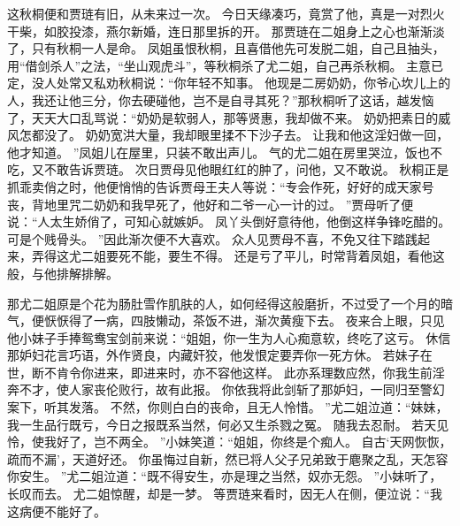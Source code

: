 这秋桐便和贾琏有旧，从未来过一次。
今日天缘凑巧，竟赏了他，真是一对烈火干柴，如胶投漆，燕尔新婚，连日那里拆的开。
那贾琏在二姐身上之心也渐渐淡了，只有秋桐一人是命。
凤姐虽恨秋桐，且喜借他先可发脱二姐，自己且抽头，用“借剑杀人”之法，“坐山观虎斗”，等秋桐杀了尤二姐，自己再杀秋桐。
主意已定，没人处常又私劝秋桐说：“你年轻不知事。
他现是二房奶奶，你爷心坎儿上的人，我还让他三分，你去硬碰他，岂不是自寻其死？”那秋桐听了这话，越发恼了，天天大口乱骂说：“奶奶是软弱人，那等贤惠，我却做不来。
奶奶把素日的威风怎都没了。
奶奶宽洪大量，我却眼里揉不下沙子去。
让我和他这淫妇做一回，他才知道。
”凤姐儿在屋里，只装不敢出声儿。
气的尤二姐在房里哭泣，饭也不吃，又不敢告诉贾琏。
次日贾母见他眼红红的肿了，问他，又不敢说。
秋桐正是抓乖卖俏之时，他便悄悄的告诉贾母王夫人等说：“专会作死，好好的成天家号丧，背地里咒二奶奶和我早死了，他好和二爷一心一计的过。
”贾母听了便说：“人太生娇俏了，可知心就嫉妒。
凤丫头倒好意待他，他倒这样争锋吃醋的。
可是个贱骨头。
”因此渐次便不大喜欢。
众人见贾母不喜，不免又往下踏践起来，弄得这尤二姐要死不能，要生不得。
还是亏了平儿，时常背着凤姐，看他这般，与他排解排解。
\par
那尤二姐原是个花为肠肚雪作肌肤的人，如何经得这般磨折，不过受了一个月的暗气，便恹恹得了一病，四肢懒动，茶饭不进，渐次黄瘦下去。
夜来合上眼，只见他小妹子手捧鸳鸯宝剑前来说：“姐姐，你一生为人心痴意软，终吃了这亏。
休信那妒妇花言巧语，外作贤良，内藏奸狡，他发恨定要弄你一死方休。
若妹子在世，断不肯令你进来，即进来时，亦不容他这样。
此亦系理数应然，你我生前淫奔不才，使人家丧伦败行，故有此报。
你依我将此剑斩了那妒妇，一同归至警幻案下，听其发落。
不然，你则白白的丧命，且无人怜惜。
”尤二姐泣道：“妹妹，我一生品行既亏，今日之报既系当然，何必又生杀戮之冤。
随我去忍耐。
若天见怜，使我好了，岂不两全。
”小妹笑道：“姐姐，你终是个痴人。
自古‘天网恢恢，疏而不漏’，天道好还。
你虽悔过自新，然已将人父子兄弟致于麀聚之乱，天怎容你安生。
”尤二姐泣道：“既不得安生，亦是理之当然，奴亦无怨。
”小妹听了，长叹而去。
尤二姐惊醒，却是一梦。
等贾琏来看时，因无人在侧，便泣说：“我这病便不能好了。
